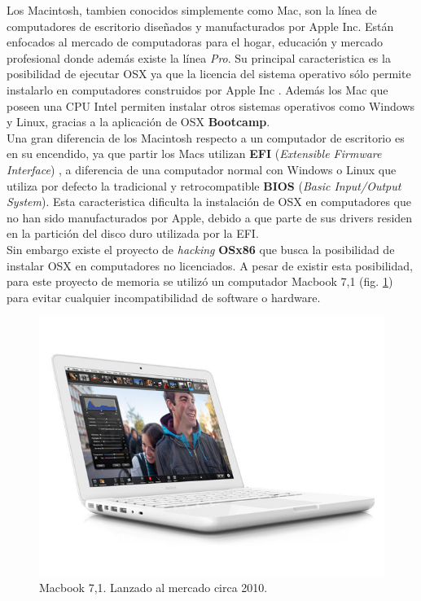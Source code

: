 		Los Macintosh, tambien conocidos simplemente como Mac, son la línea de computadores de escritorio diseñados y manufacturados por Apple Inc. Están enfocados al mercado de computadoras para el hogar, educación y mercado profesional donde además existe la línea \textit{Pro}. Su principal caracteristica es la posibilidad de ejecutar OSX ya que la licencia del sistema operativo sólo permite instalarlo en computadores construidos por Apple Inc \cite{web:license-osx}. Además los Mac que poseen una CPU Intel permiten instalar otros sistemas operativos como Windows y Linux, gracias a la aplicación de OSX \textbf{Bootcamp}.\\
		
		 Una gran diferencia de los Macintosh respecto a un computador de escritorio es en su encendido, ya que partir los Macs utilizan \textbf{EFI} (\textit{Extensible Firmware Interface}) , a diferencia de una computador normal con Windows o Linux que utiliza por defecto la tradicional y retrocompatible \textbf{BIOS} (\textit{Basic Input/Output System}). Esta caracteristica dificulta la instalación de OSX en computadores que no han sido manufacturados por Apple, debido a que parte de sus drivers residen en la partición del disco duro utilizada por la EFI.\\
		 
		 Sin embargo existe el proyecto de \textit{hacking} \textbf{OSx86} \cite{web:osx86} que busca la posibilidad de instalar OSX  en computadores no licenciados. A pesar de existir esta posibilidad, para este proyecto de memoria se utilizó un computador Macbook 7,1 (fig. \ref{img:macbook71}) para evitar cualquier incompatibilidad de software o hardware.
		 
\begin{figure}[H]
	\centering
	\includegraphics[scale=0.35]{imgs/macbook71.png} 
	\caption{Macbook 7,1. Lanzado al mercado circa 2010.}
	\label{img:macbook71}
\end{figure} 	 
		 
